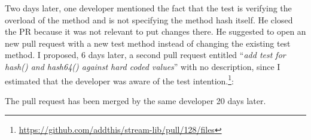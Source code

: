 Two days later, one developer mentioned the fact that the test is verifying the overload of the method and is not specifying the method hash itself. 
He closed the PR because it was not relevant to put changes there. 
He suggested to open an new pull request with a new test method instead of changing the existing test method. 
I proposed, 6 days later, a second pull request entitled ``\emph{add test for hash() and hash64() against hard coded values}'' with no description, since I estimated that the developer was aware of the test intention.\footnote{\url{https://github.com/addthis/stream-lib/pull/128/files}}:
\begin{figure}[H]
	\centering{}
\end{figure}

The pull request has been merged by the same developer 20 days later.


